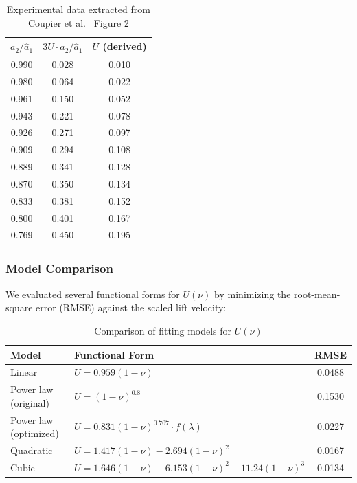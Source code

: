 \documentclass{article}
\begin{document}
\begin{table}[H]
\centering
\caption{Experimental data extracted from Coupier et al.~\cite{coupier2009} Figure 2}
\label{tab:exp_data}
\begin{tabular}{ccc}
\toprule
$a_2/\hat{a}_1$ & $3U \cdot a_2/\hat{a}_1$ & $U$ (derived) \\
\midrule
0.990 & 0.028 & 0.010 \\
0.980 & 0.064 & 0.022 \\
0.961 & 0.150 & 0.052 \\
0.943 & 0.221 & 0.078 \\
0.926 & 0.271 & 0.097 \\
0.909 & 0.294 & 0.108 \\
0.889 & 0.341 & 0.128 \\
0.870 & 0.350 & 0.134 \\
0.833 & 0.381 & 0.152 \\
0.800 & 0.401 & 0.167 \\
0.769 & 0.450 & 0.195 \\
\bottomrule
\end{tabular}
\end{table}

\subsubsection{Model Comparison}

We evaluated several functional forms for $U(\nu)$ by minimizing the root-mean-square error (RMSE) against the scaled lift velocity:

\begin{table}[H]
\centering
\caption{Comparison of fitting models for $U(\nu)$}
\label{tab:model_comparison}
\begin{tabular}{llc}
\toprule
Model & Functional Form & RMSE \\
\midrule
Linear & $U = 0.959(1-\nu)$ & 0.0488 \\
Power law (original) & $U = (1-\nu)^{0.8}$ & 0.1530 \\
Power law (optimized) & $U = 0.831(1-\nu)^{0.707} \cdot f(\lambda)$ & 0.0227 \\
Quadratic & $U = 1.417(1-\nu) - 2.694(1-\nu)^2$ & 0.0167 \\
Cubic & $U = 1.646(1-\nu) - 6.153(1-\nu)^2 + 11.24(1-\nu)^3$ & 0.0134 \\
\bottomrule
\end{tabular}
\end{table}
\end{document}
